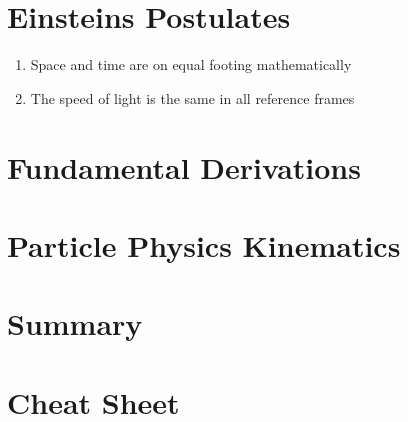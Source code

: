 

\section{Einsteins Postulates}
\begin{enumerate}
    \item Space and time are on equal footing mathematically
    \item The speed of light is the same in all reference frames
\end{enumerate}

\section{Fundamental Derivations}
\section{Particle Physics Kinematics}
\section{Summary}
\section{Cheat Sheet}
